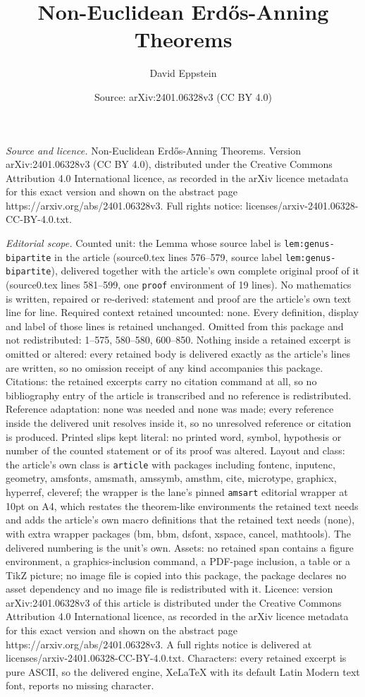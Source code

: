 \documentclass[10pt,a4paper]{amsart}
\title[Non-Euclidean Erd\H{o}s-Anning Theorems]{Non-Euclidean Erd\H{o}s-Anning Theorems}
\author{David Eppstein}
\date{Source: arXiv:2401.06328v3 (CC BY 4.0)}
\begin{document}
\maketitle

\noindent\emph{Source and licence.} Non-Euclidean Erd\H{o}s-Anning Theorems. Version arXiv:2401.06328v3 (CC BY 4.0), distributed under the Creative Commons Attribution 4.0 International licence, as recorded in the arXiv licence metadata for this exact version and shown on the abstract page https://arxiv.org/abs/2401.06328v3. Full rights notice: licenses/arxiv-2401.06328-CC-BY-4.0.txt.\par\smallskip

\noindent\textit{Editorial scope.} Counted unit: the Lemma whose source label is \texttt{lem:genus-bipartite} in the article (source0.tex lines 576--579, source label \texttt{lem:genus-bipartite}), delivered together with the article's own complete original proof of it (source0.tex lines 581--599, one \texttt{proof} environment of 19 lines). No mathematics is written, repaired or re-derived: statement and proof are the article's own text line for line. Required context retained uncounted: none. Every definition, display and label of those lines is retained unchanged. Omitted from this package and not redistributed: 1--575, 580--580, 600--850. Nothing inside a retained excerpt is omitted or altered: every retained body is delivered exactly as the article's lines are written, so no omission receipt of any kind accompanies this package. Citations: the retained excerpts carry no citation command at all, so no bibliography entry of the article is transcribed and no reference is redistributed. Reference adaptation: none was needed and none was made; every reference inside the delivered unit resolves inside it, so no unresolved reference or citation is produced. Printed slips kept literal: no printed word, symbol, hypothesis or number of the counted statement or of its proof was altered. Layout and class: the article's own class is \texttt{article} with packages including fontenc, inputenc, geometry, amsfonts, amsmath, amssymb, amsthm, cite, microtype, graphicx, hyperref, cleveref; the wrapper is the lane's pinned \texttt{amsart} editorial wrapper at 10pt on A4, which restates the theorem-like environments the retained text needs and adds the article's own macro definitions that the retained text needs (none), with extra wrapper packages (bm, bbm, dsfont, xspace, cancel, mathtools). The delivered numbering is the unit's own. Assets: no retained span contains a figure environment, a graphics-inclusion command, a PDF-page inclusion, a table or a TikZ picture; no image file is copied into this package, the package declares no asset dependency and no image file is redistributed with it. Licence: version arXiv:2401.06328v3 of this article is distributed under the Creative Commons Attribution 4.0 International licence, as recorded in the arXiv licence metadata for this exact version and shown on the abstract page https://arxiv.org/abs/2401.06328v3. A full rights notice is delivered at licenses/arxiv-2401.06328-CC-BY-4.0.txt. Characters: every retained excerpt is pure ASCII, so the delivered engine, XeLaTeX with its default Latin Modern text font, reports no missing character.
\end{document}
